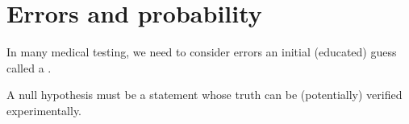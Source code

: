 \documentclass[../main.tex]{subfiles}
\begin{document}
 \section{Errors and probability}

In many medical testing, we need to consider errors  an initial (educated) guess called a .

\begin{example}
  A null hypothesis must be a statement whose truth can be (potentially) verified experimentally.
\end{example}
\end{document}
